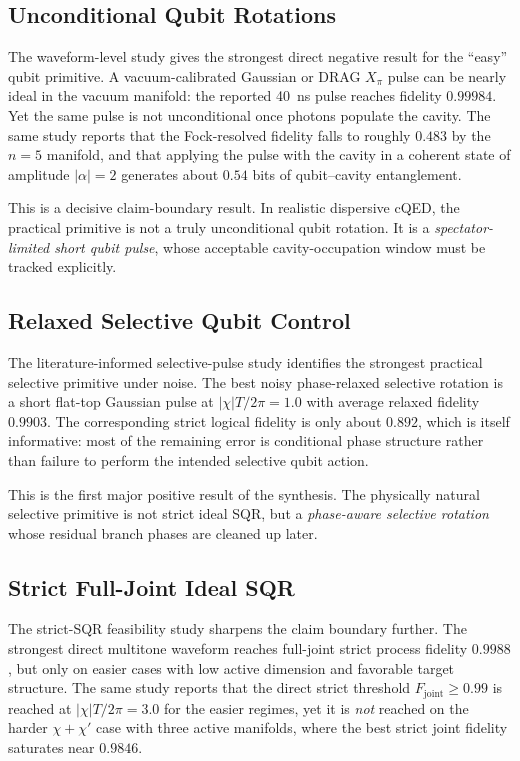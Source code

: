 \documentclass[11pt]{article}
\begin{document}
\subsection{Unconditional Qubit Rotations}

The waveform-level study gives the strongest direct negative result for the ``easy'' qubit primitive. A vacuum-calibrated Gaussian or DRAG $X_\pi$ pulse can be nearly ideal in the vacuum manifold: the reported \SI{40}{ns} pulse reaches fidelity $0.99984$. Yet the same pulse is not unconditional once photons populate the cavity. The same study reports that the Fock-resolved fidelity falls to roughly $0.483$ by the $n=5$ manifold, and that applying the pulse with the cavity in a coherent state of amplitude $|\alpha|=2$ generates about $0.54$ bits of qubit--cavity entanglement.

This is a decisive claim-boundary result. In realistic dispersive cQED, the practical primitive is not a truly unconditional qubit rotation. It is a \emph{spectator-limited short qubit pulse}, whose acceptable cavity-occupation window must be tracked explicitly.

\subsection{Relaxed Selective Qubit Control}

The literature-informed selective-pulse study identifies the strongest practical selective primitive under noise. The best noisy phase-relaxed selective rotation is a short flat-top Gaussian pulse at $|\chi|T/2\pi = 1.0$ with average relaxed fidelity $0.9903$. The corresponding strict logical fidelity is only about $0.892$, which is itself informative: most of the remaining error is conditional phase structure rather than failure to perform the intended selective qubit action.

This is the first major positive result of the synthesis. The physically natural selective primitive is not strict ideal SQR, but a \emph{phase-aware selective rotation} whose residual branch phases are cleaned up later.

\subsection{Strict Full-Joint Ideal SQR}

The strict-SQR feasibility study sharpens the claim boundary further. The strongest direct multitone waveform reaches full-joint strict process fidelity $0.9988$, but only on easier cases with low active dimension and favorable target structure. The same study reports that the direct strict threshold $F_{\mathrm{joint}} \ge 0.99$ is reached at $|\chi|T/2\pi = 3.0$ for the easier regimes, yet it is \emph{not} reached on the harder $\chi+\chi'$ case with three active manifolds, where the best strict joint fidelity saturates near $0.9846$.
\end{document}
